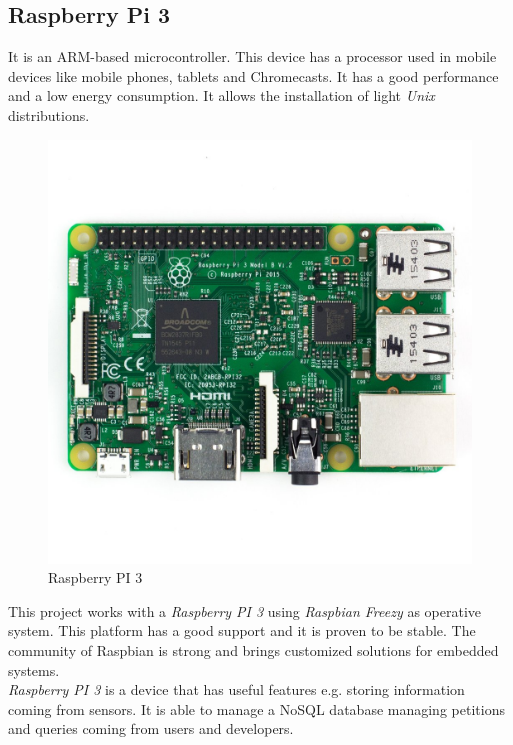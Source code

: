 \subsection{Raspberry Pi 3}

It is an ARM-based microcontroller. This device has a processor used in mobile devices like mobile phones, tablets and Chromecasts. It has a good performance and a low energy consumption. It allows the installation of light \textit{Unix} distributions.
	
\begin{figure}[H]
\begin{centering}
\includegraphics[scale=0.3]{IMGS/RPI_3.JPG}
\caption{Raspberry PI 3 \label{RPI_3}}
\end{centering}
\end{figure}

This project works with a \textit{Raspberry PI 3} using \textit{Raspbian Freezy} as operative system. This platform has a good support and it is proven to be stable. The community of Raspbian is strong and brings customized solutions for embedded systems.\\

\textit{Raspberry PI 3} is a device that has useful features e.g. storing information coming from sensors. It is able to manage a NoSQL database managing petitions and queries coming from users and developers.\\

